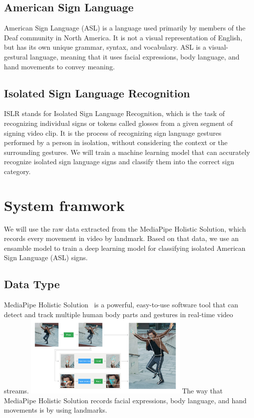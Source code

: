 \documentclass[10pt,twocolumn,letterpaper]{article}
\begin{document}
\begin{CJK*}{UTF8}{bsmi}
\subsection{American Sign Language}

American Sign Language (ASL) is a language used primarily by members of the Deaf community in North America. 
It is not a visual representation of English, but has its own unique grammar, syntax, and vocabulary. 
ASL is a visual-gestural language, meaning that it uses facial expressions, body language, and hand movements to convey meaning.

\subsection{Isolated Sign Language Recognition}

ISLR stands for Isolated Sign Language Recognition, which is the task of recognizing individual signs or tokens called glosses from a given segment of signing video clip.
It is the process of recognizing sign language gestures performed by a person in isolation, without considering the context or the surrounding gestures. 
We will train a machine learning model that can accurately recognize isolated sign language signs and classify them into the correct sign category.

\section{System framwork}
\label{sec:formatting}

We will use the raw data extracted from the MediaPipe Holistic Solution, which records every movement in video by landmark.
Based on that data, we use an ensamble model to train a deep learning model for classifying isolated American Sign Language (ASL) signs.

\subsection{Data Type}
MediaPipe Holistic Solution~\cite{https://doi.org/10.48550/arxiv.1906.08172} is a powerful, easy-to-use software tool that can detect and track multiple human body parts and gestures in real-time video streams. 
\includegraphics[width=80mm]{holistic_pipeline_example}
The way that MediaPipe Holistic Solution records facial expressions, body language, and hand movements is by using landmarks.


\end{CJK*}
\end{document}
